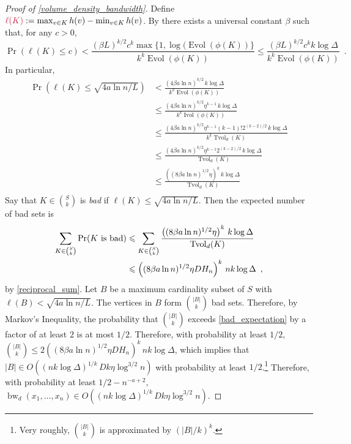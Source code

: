 \documentclass{patmorin}
\makeatletter
\renewcommand{\le}{\leqslant}
\newcommand{\defin}[1]{\emph{\textcolor{brightmaroon}{#1}}}
\def\mathcolor#1#{\@mathcolor{#1}}
\def\@mathcolor#1#2#3{%
  \protect\leavevmode
  \begingroup
    \color#1{#2}#3%
  \endgroup
}
\newcommand{\mathdefin}[1]{\mathcolor{brightmaroon}{#1}}
\DeclareMathOperator{\bw}{bw}
\DeclareMathOperator{\evol}{Evol}
\DeclareMathOperator{\ivol}{Ivol}
\DeclareMathOperator{\tvol}{Tvol}
\makeatother
\begin{document}
\begin{proof}[Proof of \cref{volume_density_bandwidth}]
  Define $\mathdefin{\ell(K)}:=\max_{v\in K}h(v)-\min_{v\in K} h(v)$.  By \cite[Theorem~9]{feige:approximating} there exists a universal constant $\beta$ such that, for any $c>0$,
  \[
      \Pr(\ell(K) \le c)
        < \frac{(\beta L)^{k/2}c^k\max\{1,\log(\evol(\phi(K))\}}{k^k\evol(\phi(K))}
        \le \frac{(\beta L)^{k/2}c^kk\log\Delta}{k^k\evol(\phi(K))} \enspace .
  \]
  In particular,
  \begin{align*}
    \Pr(\ell(K) \le \sqrt{4a\ln n/L})
      & <
      \frac{(4\beta a\ln n)^{k/2}\, k\log\Delta}{k^k\evol(\phi(K))} \\
      & \le \frac{(4\beta a\ln n)^{k/2}\eta^{k-1}\, k\log\Delta}{k^k\ivol(\phi(K))} \\
      & \le \frac{(4\beta a\ln n)^{k/2}\eta^{k-1}(k-1)!2^{(k-2)/2}\, k\log\Delta}{k^k\tvol_{d}(K)} \\
      & \le \frac{(4\beta a\ln n)^{k/2}\eta^{k-1}2^{(k-2)/2}\,k\log\Delta}{\tvol_{d}(K)} \\
      & \le \frac{\left((8\beta a\ln n)^{1/2}\eta\right)^{k}\,k\log\Delta}{\tvol_{d}(K)} \\
  \end{align*}
  Say that $K\in\binom{S}{k}$ is \defin{bad} if $\ell(K) \le \sqrt{4a\ln n/L}$. Then the expected number of bad sets is
  \begin{align}
    \sum_{K\in \binom{S}{k}} \Pr(\text{$K$ is bad})
    & \le \sum_{K\in \binom{S}{k}} \frac{\left((8\beta a\ln n)^{1/2}\eta\right)^{k}\, k\log\Delta}{\tvol_{d}(K)} \notag \\
    & \le \left((8\beta a\ln n)^{1/2}\eta DH_n\right)^{k}\, nk\log\Delta
    \enspace ,
     \label{bad_expectation}
  \end{align}
  by \cref{reciprocal_sum}.
  Let $B$ be a maximum cardinality subset of $S$ with $\ell(B)<\sqrt{4a\ln n/L}$.  The vertices in $B$ form $\binom{|B|}{k}$ bad sets. Therefore, by Markov's Inequality, the probability that $\binom{|B|}{k}$ exceeds \eqref{bad_expectation} by a factor of at least $2$ is at most $1/2$.  Therefore, with probability at least $1/2$, $\binom{|B|}{k}\le 2\left((8\beta a\ln n)^{1/2}\eta DH_n\right)^{k}\, nk\log\Delta$, which implies that $|B|\in O((nk\log\Delta)^{1/k}\,Dk\eta\log^{3/2} n)$ with probability at least $1/2$.\footnote{Very roughly, $\binom{|B|}{k}$ is approximated by $(|B|/k)^k$.}  Therefore, with probability at least $1/2-n^{-a+2}$, $\bw_d(x_1,\ldots,x_n)\in O((nk\log\Delta)^{1/k}\,Dk\eta\log^{3/2} n)$.
\end{proof}
\end{document}
